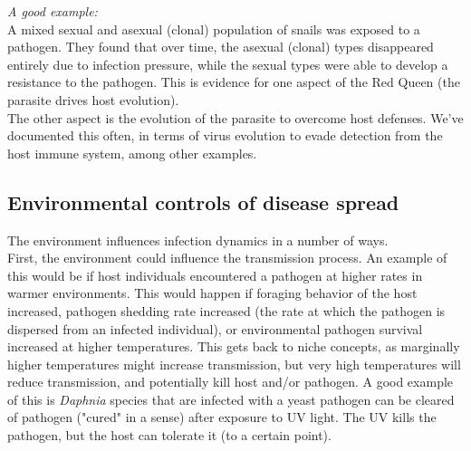 \documentclass[12pt]{article}
\begin{document}
\textit{A good example:}\\

A mixed sexual and asexual (clonal) population of snails was exposed to a pathogen. They found that over time, the asexual (clonal) types disappeared entirely due to infection pressure, while the sexual types were able to develop a resistance to the pathogen. This is evidence for one aspect of the Red Queen (the parasite drives host evolution). \\


The other aspect is the evolution of the parasite to overcome host defenses. We've documented this often, in terms of virus evolution to evade detection from the host immune system, among other examples. \\









































\clearpage


\subsection*{Environmental controls of disease spread}

The environment influences infection dynamics in a number of ways.  \\

First, the environment could influence the transmission process. An example of this would be if host individuals encountered a pathogen at higher rates in warmer environments. This would happen if foraging behavior of the host increased, pathogen shedding rate increased (the rate at which the pathogen is dispersed from an infected individual), or environmental pathogen survival increased at higher temperatures. This gets back to niche concepts, as marginally higher temperatures might increase transmission, but very high temperatures will reduce transmission, and potentially kill host and/or pathogen. A good example of this is \textit{Daphnia} species that are infected with a yeast pathogen can be cleared of pathogen ("cured" in a sense) after exposure to UV light. The UV kills the pathogen, but the host can tolerate it (to a certain point).  \\
\end{document}
